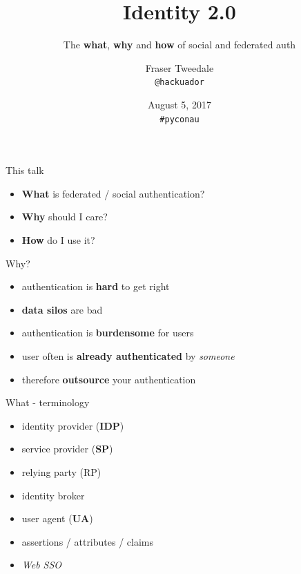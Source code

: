 \documentclass[ignorenonframetext,aspectratio=169]{beamer}
\title{\textbf{Identity 2.0}}
\subtitle{The {\bf what}, {\bf why} and {\bf how} of social and federated auth}
\author{Fraser Tweedale\\\texttt{@hackuador}}
\date{August 5, 2017\\{\tt \#pyconau}}
\institute{}
\providecommand{\tightlist}{%
  \setlength{\itemsep}{0pt}\setlength{\parskip}{0pt}}
\begin{document}
\frame[plain]{\titlepage}

\begin{frame}{This talk}

\begin{itemize}
\tightlist
\item \textbf{What} is federated / social authentication?
\item \textbf{Why} should I care?
\item \textbf{How} do I use it?
\end{itemize}

\end{frame}

\begin{frame}{Why?}

\begin{itemize}
\tightlist
\item authentication is {\bf hard} to get right
\item {\bf data silos} are bad
\item authentication is {\bf burdensome} for users
\item user often is {\bf already authenticated} by {\em someone}
\item therefore \textbf{outsource} your authentication
\end{itemize}

\end{frame}

\begin{frame}{What - terminology}
\begin{itemize}
\tightlist
\item identity provider ({\bf IDP})
\item service provider ({\bf SP})
\item relying party (RP)
\item identity broker
\item user agent ({\bf UA})
\item assertions / attributes / claims
\item {\em Web SSO}
\end{itemize}
\end{frame}
\end{document}
